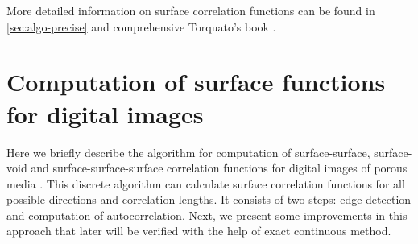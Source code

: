\documentclass[reprint,amsmath,amssymb,aps,pre,showkeys,showpacs]{revtex4-1}
\begin{document}
More detailed information on surface correlation functions can be found in
\cref{sec:algo-precise} and comprehensive Torquato's book \cite{Torquato_book}.

\section{Computation of surface functions for digital images}
\label{sec:algo}
Here we briefly describe the algorithm for computation of surface-surface,
surface-void and surface-surface-surface correlation functions for digital
images of porous media \cite{Samarin}. This discrete algorithm can calculate
surface correlation functions for all possible directions and correlation
lengths. It consists of two steps: edge detection and computation of
autocorrelation. Next, we present some improvements in this approach that later
will be verified with the help of exact continuous method.
\end{document}

